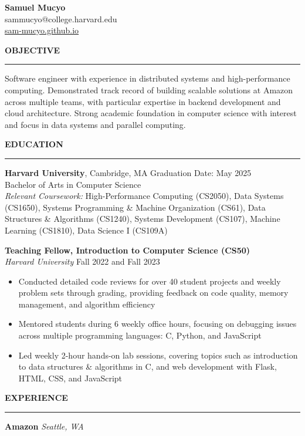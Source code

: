 \documentclass[11pt,a4paper]{article}
\newcommand{\sectionheading}[1]{\vspace{0.2cm}\textbf{\Large #1}\vspace{0.1cm}\hrule\vspace{0.3cm}}
\newcommand{\subheading}[1]{\textbf{#1}}
\newcommand{\daterange}[1]{\hfill{#1}}
\begin{document}
\begin{center}
    \textbf{\LARGE Samuel Mucyo}\\
    \vspace{0.3cm}
    sammucyo@college.harvard.edu \\
    \href{https://sam-mucyo.github.io/}{sam-mucyo.github.io} \\
\end{center}

\sectionheading{OBJECTIVE}
Software engineer with experience in distributed systems and high-performance computing. Demonstrated track record of building scalable solutions at Amazon across multiple teams, with particular expertise in backend development and cloud architecture. Strong academic foundation in computer science with interest and focus in data systems and parallel computing.

\sectionheading{EDUCATION}
\subheading{Harvard University}, Cambridge, MA \daterange{Graduation Date: May 2025}\\
Bachelor of Arts in Computer Science\\
\textit{Relevant Coursework:} High-Performance Computing (CS2050), Data Systems (CS1650), Systems Programming \& Machine Organization (CS61), Data Structures \& Algorithms (CS1240), Systems Development (CS107), Machine Learning (CS1810), Data Science I (CS109A)

\medbreak
\subheading{Teaching Fellow, Introduction to Computer Science (CS50)}\\
\textit{Harvard University} \daterange{Fall 2022 and Fall 2023}
\begin{itemize}[leftmargin=*,nosep]
    \item Conducted detailed code reviews for over 40 student projects and weekly problem sets through grading, providing feedback on code quality, memory management, and algorithm efficiency
    \item Mentored students during 6 weekly office hours, focusing on debugging issues across multiple programming languages: C, Python, and JavaScript
    \item Led weekly 2-hour hands-on lab sessions, covering topics such as introduction to data structures \& algorithms in C, and web development with Flask, HTML, CSS, and JavaScript
\end{itemize}

\sectionheading{EXPERIENCE}
\subheading{Amazon} \hfill \textit{Seattle, WA}
\end{document}
